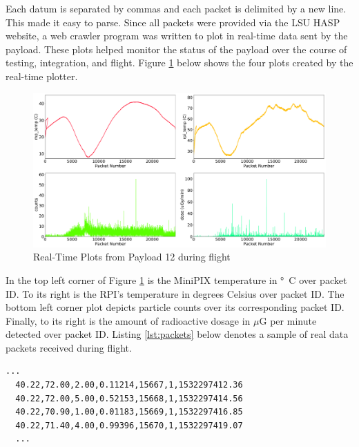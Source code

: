 Each datum is separated by commas and each packet is delimited by a new line. This made it easy to parse. Since all packets were provided 
via the LSU HASP website, a web crawler program was written to plot in real-time data sent by the payload. These plots helped monitor the 
status of the payload over the course of testing, integration, and flight. Figure \ref{fig:rtp} below shows the four plots created by the 
real-time plotter. 

\begin{figure}[H]
	\begin{center}
	\includegraphics[width=\textwidth]{figures/2018EnvironmentalPlots.pdf}
	\caption{Real-Time Plots from Payload 12 during flight}
	\label{fig:rtp}
	\end{center}
\end{figure}

In the top left corner of Figure \ref{fig:rtp} is the MiniPIX temperature in \si{\degree C} over packet ID. 
To its right is the RPI's temperature in degrees Celsius over packet ID. 
The bottom left corner plot depicts particle counts over its corresponding packet ID. 
Finally, to its right is the amount of radioactive dosage in $\mu$G per minute detected over packet ID.
Listing \ref{lst:packets} below denotes a sample of real data packets received during flight. 

\lstset{basicstyle=\small, numbers=left, xleftmargin=2em, frame=tb, label = Downlinks, framexleftmargin=1.5em}
\begin{lstlisting}[caption = Sample of downlinked data packets ID: 15667 - 15670, label={lst:packets}]
  ...
  40.22,72.00,2.00,0.11214,15667,1,1532297412.36
  40.22,72.00,5.00,0.52153,15668,1,1532297414.56
  40.22,70.90,1.00,0.01183,15669,1,1532297416.85
  40.22,71.40,4.00,0.99396,15670,1,1532297419.07
  ...
\end{lstlisting}


